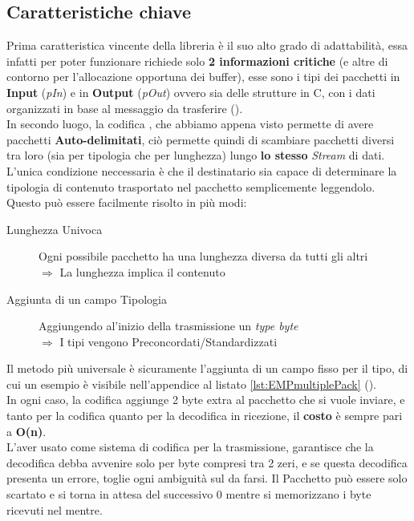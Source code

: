 \subsection{Caratteristiche chiave}
Prima caratteristica vincente della libreria è il suo alto grado di adattabilità, essa infatti per poter funzionare richiede solo \textbf{2 informazioni critiche} (e altre di contorno per l'allocazione opportuna dei buffer), esse sono i tipi dei pacchetti in \textbf{ Input} (\textit{pIn}) e in \textbf{Output} (\textit{pOut}) ovvero sia delle strutture in C, con i dati organizzati in base al messaggio da trasferire ().\\
In secondo luogo, la codifica \cite*{COBS}, che abbiamo appena visto permette di avere pacchetti \textbf{Auto-delimitati}, ciò permette quindi di scambiare pacchetti diversi tra loro (sia per tipologia che per lunghezza) lungo \textbf{lo stesso} \textit{Stream} di dati.\\
L'unica condizione neccessaria è che il destinatario sia capace di determinare la tipologia di contenuto trasportato nel pacchetto semplicemente leggendolo.\\
Questo può essere facilmente risolto in più modi:
\begin{spacing}{1.5}
	\begin{description}
		\item[Lunghezza Univoca] Ogni possibile pacchetto ha una lunghezza diversa da tutti gli altri\\
		      	\phantom{.}\hfill$\Rightarrow$ La lunghezza implica il contenuto
		\item[Aggiunta di un campo Tipologia] Aggiungendo al’inizio della trasmissione un \textit{type byte}\\
		      	\phantom{.}\hfill$\Rightarrow$ I tipi vengono Preconcordati/Standardizzati
	\end{description}
\end{spacing}
\noindent
Il metodo più universale è sicuramente l'aggiunta di un campo fisso per il tipo, di cui un esempio è visibile nell'appendice al listato \ref{lst:EMPmultiplePack} ().\\
In ogni caso, la codifica \cite*{COBS} aggiunge 2 byte extra al pacchetto che si vuole inviare, e tanto per la codifica quanto per la decodifica in ricezione, il \textbf{costo} è sempre pari a \textbf{O(n)}.\\
L’aver usato \cite*{COBS} come sistema di codifica per la trasmissione, garantisce che la decodifica debba avvenire solo per byte compresi tra 2 zeri, e se questa decodifica presenta un errore, toglie ogni ambiguità sul da farsi. Il Pacchetto può essere solo scartato e si torna in attesa del successivo 0 mentre si memorizzano i byte ricevuti nel mentre.\vspace{-8mm}
